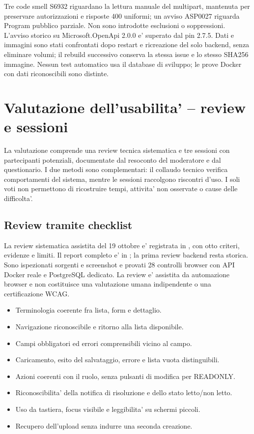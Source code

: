 \documentclass[11pt,a4paper,oneside]{report}
\begin{document}
Tre code smell S6932 riguardano la lettura manuale del multipart, mantenuta
per preservare autorizzazioni e risposte 400 uniformi; un avviso ASP0027
riguarda Program pubblico parziale. Non sono introdotte esclusioni o
soppressioni. L'avviso storico su Microsoft.OpenApi 2.0.0 e' superato dal pin
2.7.5. Dati e immagini sono stati confrontati dopo restart e ricreazione del
solo backend, senza eliminare volumi; il rebuild successivo conserva la
stessa issue e lo stesso SHA256 immagine. Nessun test automatico usa il
database di sviluppo; le prove Docker con dati riconoscibili sono distinte.

\section{Valutazione dell'usabilita' -- review e sessioni}
La valutazione comprende una review tecnica sistematica e tre sessioni
con partecipanti potenziali, documentate dal resoconto del moderatore e
dal questionario. I due metodi sono complementari: il collaudo tecnico
verifica comportamenti del sistema, mentre le sessioni raccolgono
riscontri d'uso. I soli voti non permettono di ricostruire tempi,
attivita' non osservate o cause delle difficolta'.

\subsection{Review tramite checklist}
La review sistematica assistita del 19 ottobre e' registrata in
, con otto criteri, evidenze e limiti.
Il report completo e' in ;
la prima review backend resta storica. Sono ispezionati sorgenti e screenshot
e provati 28 controlli browser con API Docker reale e PostgreSQL dedicato.
La review e' assistita da automazione browser e non costituisce una
valutazione umana indipendente o una certificazione WCAG.
\begin{itemize}
\item Terminologia coerente fra lista, form e dettaglio.
\item Navigazione riconoscibile e ritorno alla lista disponibile.
\item Campi obbligatori ed errori comprensibili vicino al campo.
\item Caricamento, esito del salvataggio, errore e lista vuota distinguibili.
\item Azioni coerenti con il ruolo, senza pulsanti di modifica per READONLY.
\item Riconoscibilita' della notifica di risoluzione e dello stato letto/non letto.
\item Uso da tastiera, focus visibile e leggibilita' su schermi piccoli.
\item Recupero dell'upload senza indurre una seconda creazione.
\end{itemize}
\end{document}
